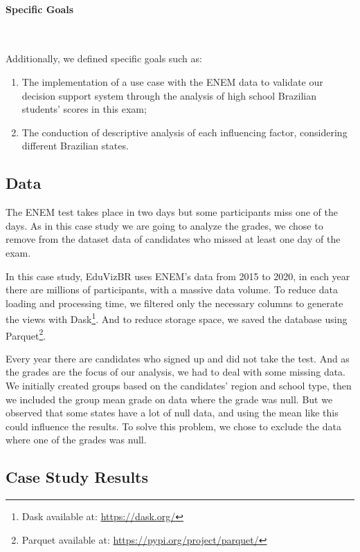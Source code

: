 \documentclass[12pt]{article}
\begin{document}
\paragraph{Specific Goals}\

Additionally, we defined specific goals such as: 

\begin{enumerate}
    \item The implementation of a use case with the ENEM data to validate our decision support system through the analysis of high school Brazilian students' scores in this exam;
    \item The conduction of descriptive analysis of each influencing factor, considering different Brazilian states.
\end{enumerate}



\subsection{Data}

The ENEM test takes place in two days but some participants miss one of the days. As in this case study we are going to analyze the grades, we chose to remove from the dataset data of candidates who missed at least one day of the exam.

In this case study, EduVizBR uses ENEM's data from 2015 to 2020, in each year there are millions of participants, with a massive data volume. To reduce data loading and processing time, we filtered only the necessary columns to generate the views with Dask\footnote{Dask available at: \url{https://dask.org/}}. And to reduce storage space, we saved the database using Parquet\footnote{Parquet available at: \url{https://pypi.org/project/parquet/}}.

Every year there are candidates who signed up and did not take the test. And as the grades are the focus of our analysis, we had to deal with some missing data. We initially created groups based on the candidates' region and school type, then we included the group mean grade on data where the grade was null. But we observed that some states have a lot of null data, and using the mean like this could influence the results. To solve this problem, we chose to exclude the data where one of the grades was null.

\subsection{Case Study Results}
\end{document}
